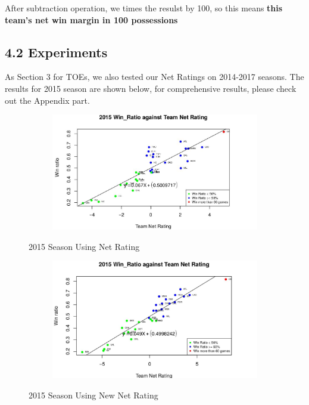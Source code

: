 \documentclass[11pt]{article}
\begin{document}
After subtraction operation, we times the resulst by 100, so this means \textbf{this team's net win margin in 100 possessions}

\subsection*{4.2 Experiments}
As Section 3 for TOEs, we also tested our Net Ratings on 2014-2017 seasons.
The results for 2015 season are shown below, for comprehensive results, please check out the Appendix part.

\begin{figure}[h!]
  \centering
  \begin{subfigure}[b]{0.45\linewidth}
    \includegraphics[width=\linewidth]{old_nr.jpg}
  \end{subfigure}
  \caption{2015 Season Using Net Rating}
  \begin{subfigure}[b]{0.45\linewidth}
    \includegraphics[width=\linewidth]{new_nr.jpg}
  \end{subfigure}
    \caption{2015 Season Using New Net Rating}
\end{figure}
\end{document}
